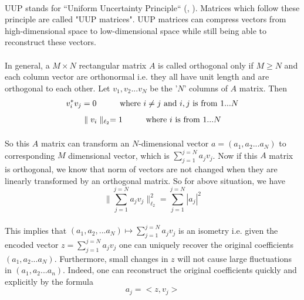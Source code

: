 \paragraph{}UUP stands for “Uniform Uncertainty Principle“ (\cite{cand05}, \cite{cand07}). Matrices which follow these principle 
are called "UUP matrices". UUP matrices can compress vectors from high-dimensional space to low-dimensional space while
still being able to reconstruct these vectors. 

\paragraph{}In general, a $M \times N$ rectangular matrix $A$ is called orthogonal only if $M \geq N$ and each
column vector are orthonormal i.e. they all have unit length and are orthogonal to each other. Let 
$v_1, v_2 ... v_N$ be the '$N$' columns of $A$ matrix. Then
\begin{equation}
 v_i^*v_j   = 0 \hspace{10mm} \mbox{where } i \neq j \mbox{ and } i,j \mbox{ is from } 1 ... N
\label{1.9}
\end{equation}
\begin{equation}
 \parallel v_i \parallel_{\ell_2} = 1 \hspace{10mm} \mbox{where } i \mbox{ is from } 1 ... N
\label{1.10}
\end{equation}

\paragraph{}So this $A$ matrix can transform an $N$-dimensional vector $a =(a_1, a_2 ...a_N)$ to corresponding $M$ dimensional
vector, which is $ \displaystyle\sum\limits_{j=1}^{j=N} a_j v_j$. Now if this $A$ matrix is orthogonal, we know that norm 
of vectors are not changed when they are linearly transformed by an orthogonal matrix. So for above situation, we have
\begin{equation}
 \parallel \displaystyle\sum\limits_{j=1}^{j=N} a_j v_j \parallel_{\ell_2}^2  = \displaystyle\sum\limits_{j=1}^{j=N} |a_j|^2
\label{1.11}
\end{equation}

\paragraph{}This implies that $(a_1, a_2, ... a_N) \mapsto \displaystyle\sum\limits_{j=1}^{j=N} a_j v_j $ is an isometry i.e. 
given the encoded vector $ z = \displaystyle\sum\limits_{j=1}^{j=N} a_j v_j$ one can uniquely recover the original coefficients 
$(a_1, a_2 ... a_N)$. Furthermore, small changes in $z$ will not cause large fluctuations in $(a_1, a_2 ... a_n)$. Indeed, 
one can reconstruct the original coefficients quickly and explicitly by the formula 
\begin{equation}
 a_j = < z, v_j> 
\label{1.12}
\end{equation}

